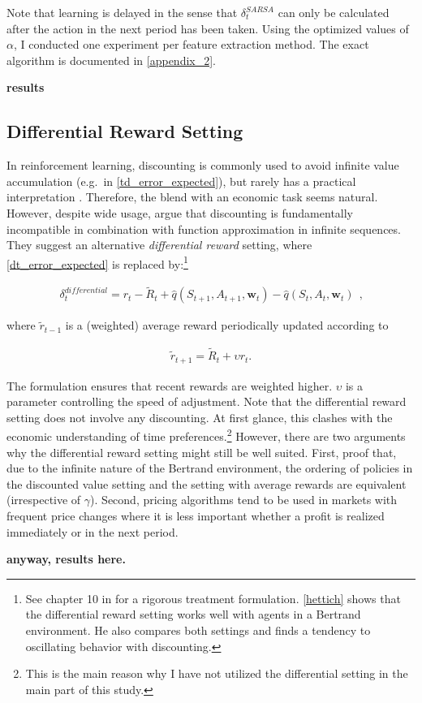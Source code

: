 Note that learning is delayed in the sense that $\delta_t^{SARSA}$ can only be calculated after the action in the next period has been taken. Using the optimized values of $\alpha$, I conducted one experiment per feature extraction method. The exact algorithm is documented in \autoref{appendix_2}.

\textbf{results}
		
\subsection{Differential Reward Setting}

In reinforcement learning, discounting is commonly used to avoid infinite value accumulation (e.g.\ in \autoref{td_error_expected}), but rarely has a practical interpretation \parencite{schwartz_reinforcement_1993}. Therefore, the blend with an economic task seems natural. However, despite wide usage, \textcite{naik_discounted_2019} argue that discounting is fundamentally incompatible in combination with function approximation in infinite sequences. They suggest an alternative \emph{differential reward} setting, where \autoref{dt_error_expected} is replaced by:\footnote{See chapter 10 in \textcite{sutton_reinforcement_2018} for a rigorous treatment formulation. \autoref{hettich} shows that the differential reward setting works well with agents in a Bertrand environment. He also compares both settings and finds a tendency to oscillating behavior with discounting.}


\begin{gather}\label{differential_reward}
\delta_t^{differential} = r_t - \widetilde{R}_{t} + \hat{q}(S_{t+1}, A_{t+1}, \boldsymbol{w}_t) - \hat{q}(S_t, A_t, \boldsymbol{w}_t) ~~  \text{,}
\end{gather}

where $\widetilde{r}_{t-1}$ is a (weighted) average reward periodically updated according to

\begin{gather}
	\widetilde{r}_{t+1} = \widetilde{R}_t + \upsilon r_t\text{.}
\end{gather}

The formulation ensures that recent rewards are weighted higher. $\upsilon$ is a parameter controlling the speed of adjustment. Note that the differential reward setting does not involve any discounting. At first glance, this clashes with the economic understanding of time preferences.\footnote{This is the main reason why I have not utilized the differential setting in the main part of this study.} However, there are two arguments why the differential reward setting might still be well suited. First, \textcite{sutton_reinforcement_2018} proof that, due to the infinite nature of the Bertrand environment, the ordering of policies in the discounted value setting and the setting with average rewards are equivalent (irrespective of $\gamma$). Second, pricing algorithms tend to be used in markets with frequent price changes where it is less important whether a profit is realized immediately or in the next period.

\textbf{anyway, results here.}


\pagebreak